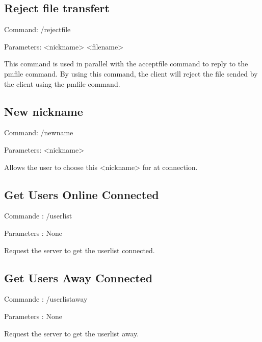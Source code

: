 \documentclass[12pt]{article}
\begin{document}
\begin{flushleft}
    \subsection{Reject file transfert}
Command: /rejectfile

Parameters: <nickname> <filename>

This command is used in parallel with the acceptfile command to reply to the pmfile command. By using this command, the client will reject the file sended by the client using the pmfile command.


    \subsection{New nickname}
Command: /newname

Parameters: <nickname>

Allows the user to choose this <nickname> for at connection. 

    \subsection{Get Users Online Connected}
Commande : /userlist

Parameters : None

Request the server to get the userlist connected.


    \subsection{Get Users Away  Connected}
Commande : /userlistaway

Parameters : None

Request the server to get the userlist away.

\clearpage
\listoffigures
\end{flushleft}
\end{document}
